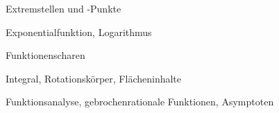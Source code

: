


\begin{inhalt}
	\item Extremstellen und -Punkte
	\item Exponentialfunktion, Logarithmus
	\item Funktionenscharen
  \item Integral, Rotationskörper, Flächeninhalte
	\item Funktionsanalyse, gebrochenrationale Funktionen, Asymptoten
\end{inhalt}





